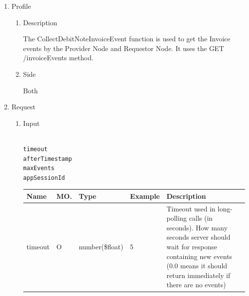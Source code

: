 \begin{enumerate}

\item Profile

\begin{enumerate}

\item Description

The CollectDebitNoteInvoiceEvent function is used to get the Invoice events by the Provider Node and Requestor Node. 
It uses the GET /invoiceEvents method.
 
\item Side

Both

\end{enumerate}

\item Request

\begin{enumerate}

\item Input

\begin{tcolorbox}[boxrule=0pt, frame empty]
\begin{verbatim}

timeout
afterTimestamp
maxEvents
appSessionId

\end{verbatim}
\end{tcolorbox}


\begin{table}[H]
\footnotesize

\begin{center}
\begin{tabular}{|p{3cm}|l|p{3cm}|p{3cm}|p{4cm}|} 
\hline
\rowcolor{lightgray}	Name	& MO.	& Type	& Example & 	Description \\
\hline

timeout					& O	& 	number(\$float)		&	5							&	Timeout used in long-polling calls (in seconds). 
																						How many seconds server should wait for response containing new events 
																						(0.0 means it should return immediately if there are no events) \\ 
\hline


\end{tabular}
\end{center}
\end{table}
\end{enumerate}
\end{enumerate}
